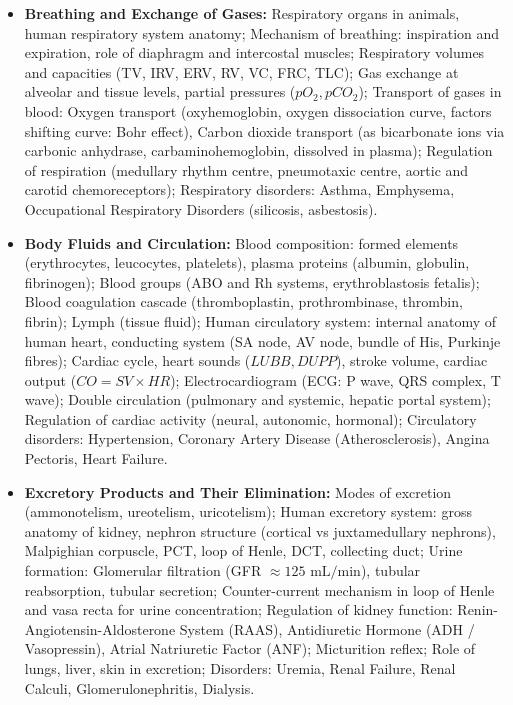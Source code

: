 \documentclass[11pt,a4paper]{article}
\begin{document}
\begin{itemize}
  \item \textbf{Breathing and Exchange of Gases:} Respiratory organs in animals, human respiratory system anatomy; Mechanism of breathing: inspiration and expiration, role of diaphragm and intercostal muscles; Respiratory volumes and capacities (TV, IRV, ERV, RV, VC, FRC, TLC); Gas exchange at alveolar and tissue levels, partial pressures ($pO_2, pCO_2$); Transport of gases in blood: Oxygen transport (oxyhemoglobin, oxygen dissociation curve, factors shifting curve: Bohr effect), Carbon dioxide transport (as bicarbonate ions via carbonic anhydrase, carbaminohemoglobin, dissolved in plasma); Regulation of respiration (medullary rhythm centre, pneumotaxic centre, aortic and carotid chemoreceptors); Respiratory disorders: Asthma, Emphysema, Occupational Respiratory Disorders (silicosis, asbestosis).
  \item \textbf{Body Fluids and Circulation:} Blood composition: formed elements (erythrocytes, leucocytes, platelets), plasma proteins (albumin, globulin, fibrinogen); Blood groups (ABO and Rh systems, erythroblastosis fetalis); Blood coagulation cascade (thromboplastin, prothrombinase, thrombin, fibrin); Lymph (tissue fluid); Human circulatory system: internal anatomy of human heart, conducting system (SA node, AV node, bundle of His, Purkinje fibres); Cardiac cycle, heart sounds ($LUBB, DUPP$), stroke volume, cardiac output ($CO = SV \times HR$); Electrocardiogram (ECG: P wave, QRS complex, T wave); Double circulation (pulmonary and systemic, hepatic portal system); Regulation of cardiac activity (neural, autonomic, hormonal); Circulatory disorders: Hypertension, Coronary Artery Disease (Atherosclerosis), Angina Pectoris, Heart Failure.
  \item \textbf{Excretory Products and Their Elimination:} Modes of excretion (ammonotelism, ureotelism, uricotelism); Human excretory system: gross anatomy of kidney, nephron structure (cortical vs juxtamedullary nephrons), Malpighian corpuscle, PCT, loop of Henle, DCT, collecting duct; Urine formation: Glomerular filtration (GFR $\approx 125\text{ mL/min}$), tubular reabsorption, tubular secretion; Counter-current mechanism in loop of Henle and vasa recta for urine concentration; Regulation of kidney function: Renin-Angiotensin-Aldosterone System (RAAS), Antidiuretic Hormone (ADH / Vasopressin), Atrial Natriuretic Factor (ANF); Micturition reflex; Role of lungs, liver, skin in excretion; Disorders: Uremia, Renal Failure, Renal Calculi, Glomerulonephritis, Dialysis.

\end{itemize}
\end{document}
